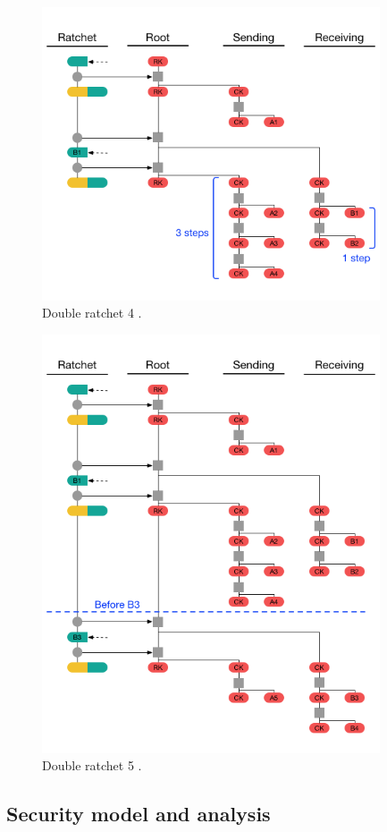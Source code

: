 \begin{figure}[H]
	\centering
	\includegraphics[width=10cm]{figures/doubleratchet4.png}
	\caption{Double ratchet 4 \cite{doubleratchet}.}
	\label{fig:doubleratchet4}
\end{figure}

\begin{figure}[H]
	\centering
	\includegraphics[width=10cm]{figures/doubleratchet5.png}
	\caption{Double ratchet 5 \cite{doubleratchet}.}
	\label{fig:doubleratchet5}
\end{figure}

\subsection{Security model and analysis}


